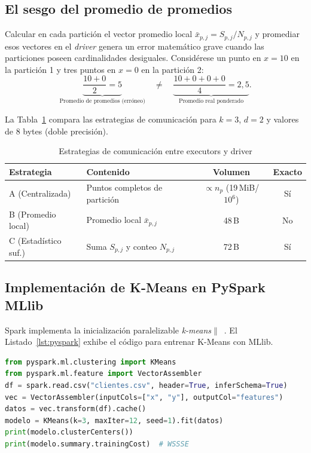 \documentclass[conference,a4paper]{IEEEtran}
\begin{document}
\subsection{El sesgo del promedio de promedios}

Calcular en cada partición el vector promedio local $\bar{x}_{p,j} = S_{p,j} / N_{p,j}$ y promediar esos vectores en el \textit{driver} genera un error matemático grave cuando las particiones poseen cardinalidades desiguales. Considérese un punto en $x=10$ en la partición 1 y tres puntos en $x=0$ en la partición 2:
\begin{equation}
\underbrace{\frac{10 + 0}{2} = 5}_{\text{Promedio de promedios (erróneo)}}
\quad\neq\quad
\underbrace{\frac{10 + 0 + 0 + 0}{4} = 2{,}5}_{\text{Promedio real ponderado}} .
\end{equation}

La Tabla~\ref{tab:mensajes} compara las estrategias de comunicación para $k=3$, $d=2$ y valores de 8 bytes (doble precisión).

\begin{table}[t]
\caption{Estrategias de comunicación entre executors y driver}
\label{tab:mensajes}
\centering
\footnotesize
\begin{tabular}{@{}l>{\raggedright\arraybackslash}p{2.3cm}cc@{}}
\toprule
\textbf{Estrategia} & \textbf{Contenido} & \textbf{Volumen} & \textbf{Exacto} \\
\midrule
A (Centralizada) & Puntos completos de partición & $\propto n_p$ (19\,MiB/$10^6$) & Sí \\
B (Promedio local) & Promedio local $\bar{x}_{p,j}$ & 48\,B & No \\
C (Estadístico suf.) & Suma $S_{p,j}$ y conteo $N_{p,j}$ & 72\,B & Sí \\
\bottomrule
\end{tabular}
\vspace{-5pt}
\end{table}

\subsection{Implementación de K-Means en PySpark MLlib}

Spark implementa la inicialización paralelizable \textit{k-means$\|$}~\cite{bahmani2012scalable}. El Listado~\ref{lst:pyspark} exhibe el código para entrenar K-Means con MLlib.

\begin{lstlisting}[language=Python, caption={K-Means con PySpark y MLlib}, label={lst:pyspark}]
from pyspark.ml.clustering import KMeans
from pyspark.ml.feature import VectorAssembler
df = spark.read.csv("clientes.csv", header=True, inferSchema=True)
vec = VectorAssembler(inputCols=["x", "y"], outputCol="features")
datos = vec.transform(df).cache()
modelo = KMeans(k=3, maxIter=12, seed=1).fit(datos)
print(modelo.clusterCenters())
print(modelo.summary.trainingCost)  # WSSSE
\end{lstlisting}
\end{document}
